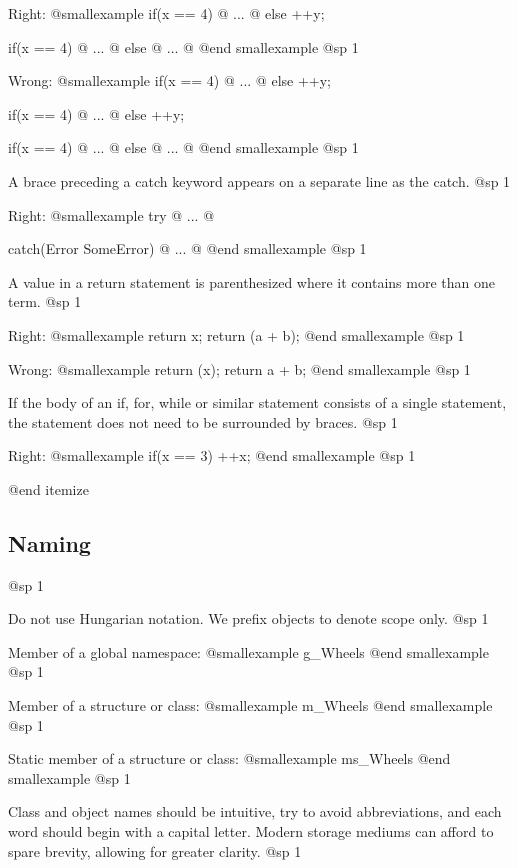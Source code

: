 Right:
@smallexample
if(x == 4)
@{
    ...
@}
else
  ++y;

if(x == 4)
@{
    ...
@}
else
@{
    ...
@}
@end smallexample
@sp 1

Wrong:
@smallexample
if(x == 4) @{
    ...
@}
else ++y;

if(x == 4) @{
    ...
@} else ++y;

if(x == 4) @{
    ...
@}
else @{
    ...
@}
@end smallexample
@sp 1

\item
A brace preceding a catch keyword appears on a separate line as the catch. 
@sp 1

Right:
@smallexample
try
@{
    ...
@}

catch(Error SomeError)
@{
    ...
@}
@end smallexample
@sp 1

\item
A value in a return statement is parenthesized where it contains more than one term.
@sp 1

Right:
@smallexample
return x;
return (a + b);
@end smallexample
@sp 1

Wrong:
@smallexample
return (x);
return a + b;
@end smallexample
@sp 1

\item
If the body of an if, for, while or similar statement consists of a single statement, the statement does not need to be surrounded by braces.
@sp 1

Right:
@smallexample
if(x == 3)
  ++x;
@end smallexample
@sp 1

@end itemize

\subsection{Naming}
@sp 1

\itemize
\item
Do not use Hungarian notation. We prefix objects to denote scope only.
@sp 1

Member of a global namespace:
@smallexample
g_Wheels
@end smallexample
@sp 1

Member of a structure or class:
@smallexample
m_Wheels
@end smallexample
@sp 1

Static member of a structure or class:
@smallexample
ms_Wheels
@end smallexample
@sp 1

\item
Class and object names should be intuitive, try to avoid abbreviations, and each word should begin with a capital letter. Modern storage mediums can afford to spare brevity, allowing for greater clarity.
@sp 1

